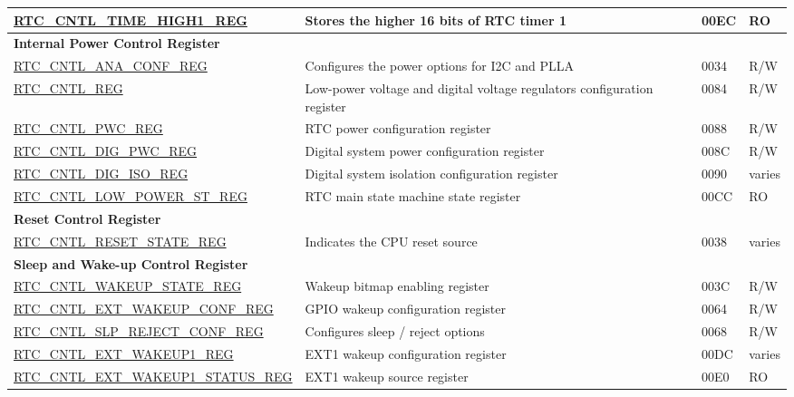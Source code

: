 \begin{longtable}{ | p{6.5cm} | p{6.8cm} | p{1.3cm} | p{1cm} | }
\hyperref[regdesc:RTCCNTLTIMEHIGH1REG]{RTC\_CNTL\_TIME\_HIGH1\_REG} & Stores the higher 16 bits of RTC timer 1  & \hexprefix{}00EC & RO \\ \hline
\multicolumn{4}{|l|}{\textbf{Internal Power Control Register}} \\ \hline
\hyperref[regdesc:RTCCNTLANACONFREG]{RTC\_CNTL\_ANA\_CONF\_REG} & Configures the power options for I2C and PLLA  & \hexprefix{}0034 & R/W \\ \hline
\hyperref[regdesc:RTCCNTLREG]{RTC\_CNTL\_REG} & Low-power voltage and digital voltage regulators configuration register & \hexprefix{}0084 & R/W \\ \hline
\hyperref[regdesc:RTCCNTLPWCREG]{RTC\_CNTL\_PWC\_REG} & RTC power configuration register & \hexprefix{}0088 & R/W \\ \hline
\hyperref[regdesc:RTCCNTLDIGPWCREG]{RTC\_CNTL\_DIG\_PWC\_REG} & Digital system power configuration register & \hexprefix{}008C & R/W \\ \hline
\hyperref[regdesc:RTCCNTLDIGISOREG]{RTC\_CNTL\_DIG\_ISO\_REG} & Digital system isolation configuration register & \hexprefix{}0090 & varies \\ \hline
\hyperref[regdesc:RTCCNTLLOWPOWERSTREG]{RTC\_CNTL\_LOW\_POWER\_ST\_REG} & RTC main state machine state register & \hexprefix{}00CC & RO \\ \hline
\multicolumn{4}{|l|}{\textbf{Reset Control Register}} \\ \hline
\hyperref[regdesc:RTCCNTLRESETSTATEREG]{RTC\_CNTL\_RESET\_STATE\_REG} & Indicates the CPU reset source  & \hexprefix{}0038 & varies \\ \hline
\multicolumn{4}{|l|}{\textbf{Sleep and Wake-up Control Register}} \\ \hline
\hyperref[regdesc:RTCCNTLWAKEUPSTATEREG]{RTC\_CNTL\_WAKEUP\_STATE\_REG} & Wakeup bitmap enabling register & \hexprefix{}003C & R/W \\ \hline
\hyperref[regdesc:RTCCNTLEXTWAKEUPCONFREG]{RTC\_CNTL\_EXT\_WAKEUP\_CONF\_REG} & GPIO wakeup configuration register & \hexprefix{}0064 & R/W \\ \hline
\hyperref[regdesc:RTCCNTLSLPREJECTCONFREG]{RTC\_CNTL\_SLP\_REJECT\_CONF\_REG} & Configures sleep / reject options & \hexprefix{}0068 & R/W \\ \hline
\hyperref[regdesc:RTCCNTLEXTWAKEUP1REG]{RTC\_CNTL\_EXT\_WAKEUP1\_REG} & EXT1 wakeup configuration register & \hexprefix{}00DC & varies \\ \hline
\hyperref[regdesc:RTCCNTLEXTWAKEUP1STATUSREG]{RTC\_CNTL\_EXT\_WAKEUP1\_STATUS\_REG} & EXT1 wakeup source register & \hexprefix{}00E0 & RO \\ \hline

\end{longtable}
